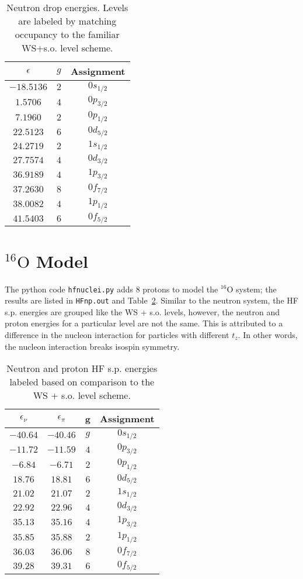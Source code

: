 \documentclass[]{scrartcl}
\newcommand{\oxygen}[1]{%
	\ensuremath{ ^{#1} \mathrm{O} }}
\begin{document}
\begin{table}
\centering
	\begin{tabular}{ c c | c }
	$\epsilon $ & $g$ & Assignment\\
\hline
	$-18.5136$ & $2$ & $0 s _{1/2}$\\
	$1.5706$    & $4$ & $0 p _{3/2}$\\
	$7.1960$    & $2$ & $0 p _{1/2}$\\
	$22.5123$ & $6$ & $0 d _{5/2}$\\
	$24.2719$ & $2$ & $1 s _{1/2}$\\
	$27.7574$ & $4$ & $0 d _{3/2}$\\
	$36.9189$ & $4$ & $1 p _{3/2}$\\
	$37.2630$ & $8$ & $0 f _{7/2}$\\
	$38.0082$ & $4$ & $1 p_{1/2}$\\
	$41.5403$ & $6$ & $0 f _{5/2}$\\
\hline
	\end{tabular}
	\caption{Neutron drop energies. Levels are labeled by matching occupancy to the familiar WS+s.o. level scheme.}
	\label{tab:Nout}
\end{table}

\section*{\oxygen{16} Model}

The python code \texttt{hfnuclei.py} adds 8 protons to model the \oxygen{16} system; the results are listed in \texttt{HFnp.out} and Table~\ref{tab:o16out}. Similar to the neutron system, the HF s.p. energies are grouped like the WS + s.o. levels, however, the neutron and proton energies for a particular level are not the same. This is attributed to a difference in the nucleon interaction for particles with different $t_z$. In other words, the nucleon interaction breaks isospin symmetry.

\begin{table}
\centering
	\begin{tabular}{ c c | c | c }
	$\epsilon _{\nu} $ & $\epsilon _{\pi} $ & g & Assignment\\
\hline
	$-40.64$ & $-40.46$ & $g$ & $0 s _{1/2}$\\
	$-11.72$ & $-11.59$ & $4$ & $0 p _{3/2}$\\
	$-6.84$ & $-6.71$ & $2$ & $0 p _{1/2}$\\
	$18.76$ & $18.81$ & $6$ & $0 d _{5/2}$\\
	$21.02$ & $21.07$ & $2$ & $1 s _{1/2}$\\
	$22.92$ & $22.96$ & $4$ & $0 d _{3/2}$\\
	$35.13$ & $35.16$ & $4$ & $1 p _{3/2}$\\
	$35.85$ & $35.88$ & $2$ & $1 p _{1/2}$\\
	$36.03$ & $36.06$ & $8$ & $0 f _{7/2}$\\
	$39.28$ & $39.31$ & $6$ & $0f _{5/2}$\\
\hline
	\end{tabular}
	\caption{Neutron and proton HF s.p. energies labeled based on comparison to the WS + s.o. level scheme.}
	\label{tab:o16out}
\end{table}
	
\end{document}
